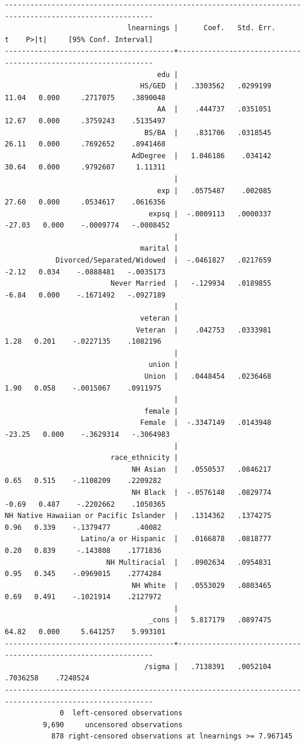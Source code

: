 \documentclass[
]{book}
\begin{document}
\begin{verbatim}
---------------------------------------------------------------------------------------------------------
                             lnearnings |      Coef.   Std. Err.      t    P>|t|     [95% Conf. Interval]
----------------------------------------+----------------------------------------------------------------
                                    edu |
                                HS/GED  |   .3303562   .0299199    11.04   0.000     .2717075    .3890048
                                    AA  |    .444737   .0351051    12.67   0.000     .3759243    .5135497
                                 BS/BA  |    .831706   .0318545    26.11   0.000     .7692652    .8941468
                              AdDegree  |   1.046186    .034142    30.64   0.000     .9792607     1.11311
                                        |
                                    exp |   .0575487    .002085    27.60   0.000     .0534617    .0616356
                                  expsq |  -.0009113   .0000337   -27.03   0.000    -.0009774   -.0008452
                                        |
                                marital |
            Divorced/Separated/Widowed  |  -.0461827   .0217659    -2.12   0.034    -.0888481   -.0035173
                         Never Married  |   -.129934   .0189855    -6.84   0.000    -.1671492   -.0927189
                                        |
                                veteran |
                               Veteran  |    .042753   .0333981     1.28   0.201    -.0227135    .1082196
                                        |
                                  union |
                                 Union  |   .0448454   .0236468     1.90   0.058    -.0015067    .0911975
                                        |
                                 female |
                                Female  |  -.3347149   .0143948   -23.25   0.000    -.3629314   -.3064983
                                        |
                         race_ethnicity |
                              NH Asian  |   .0550537   .0846217     0.65   0.515    -.1108209    .2209282
                              NH Black  |  -.0576148   .0829774    -0.69   0.487    -.2202662    .1050365
NH Native Hawaiian or Pacific Islander  |   .1314362   .1374275     0.96   0.339    -.1379477      .40082
                  Latino/a or Hispanic  |   .0166878   .0818777     0.20   0.839     -.143808    .1771836
                        NH Multiracial  |   .0902634   .0954831     0.95   0.345    -.0969015    .2774284
                              NH White  |   .0553029   .0803465     0.69   0.491    -.1021914    .2127972
                                        |
                                  _cons |   5.817179   .0897475    64.82   0.000     5.641257    5.993101
----------------------------------------+----------------------------------------------------------------
                                 /sigma |   .7138391   .0052104                      .7036258    .7240524
---------------------------------------------------------------------------------------------------------
             0  left-censored observations
         9,690     uncensored observations
           878 right-censored observations at lnearnings >= 7.967145
\end{verbatim}
\end{document}
